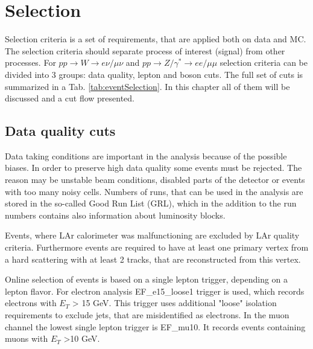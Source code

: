 \chapter{Selection}\label{chap:EventSelection}
Selection criteria is a set of requirements, that are applied both on data and MC. The selection criteria should  separate process of interest (signal) from other processes. For $pp \to W \to e\nu/\mu\nu$ and $pp \to Z/\gamma^* \to ee/\mu\mu$ selection criteria can be divided into 3 groups: data quality, lepton and boson cuts. The full set of cuts is summarized in a Tab. \ref{tab:eventSelection}. In this chapter all of them will be discussed and a cut flow presented. 
\section{Data quality cuts}




Data taking conditions are important in the analysis because of the possible biases. In order to preserve high data quality some events must be rejected. The reason may be unstable beam conditions, disabled parts of the detector or events with too many noisy cells. Numbers of runs, that can be used in the analysis are stored in the so-called Good Run List (GRL), which in the addition to the run numbers contains also information about luminosity blocks. 

Events, where LAr calorimeter was malfunctioning are excluded by LAr quality criteria. Furthermore events are required to have at least one primary vertex from a hard scattering with at least 2 tracks, that are reconstructed from this vertex. 

Online selection of events is based on a single lepton trigger, depending on a lepton flavor. For electron analysis EF\_e15\_loose1 trigger is used, which records electrons with $E_T$ > 15 GeV. This trigger uses additional "loose" isolation requirements to exclude jets, that are misidentified as electrons. In the muon channel the lowest single lepton trigger is EF\_mu10.  It records events containing muons with $E_T$ >10 GeV.


